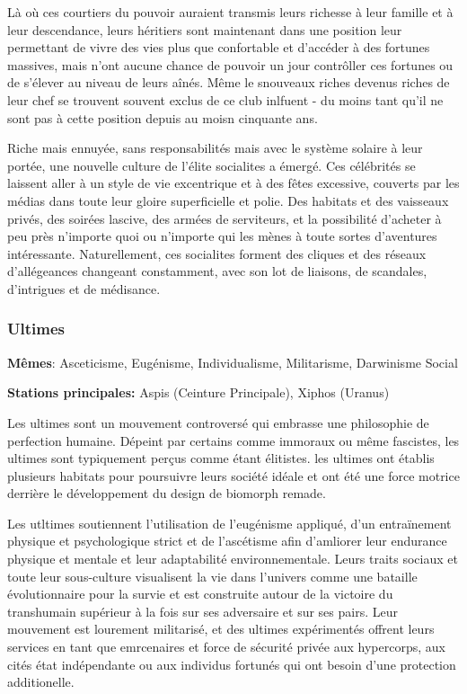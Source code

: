                                              Là où ces courtiers du pouvoir auraient transmis leurs richesse à leur famille et à leur descendance, leurs héritiers sont maintenant dans une position leur permettant de vivre des vies plus que confortable et d'accéder à des fortunes massives, mais n'ont aucune chance de pouvoir un jour contrôller ces fortunes ou de s'élever au niveau de leurs aînés. Même le snouveaux riches devenus riches de leur chef se trouvent souvent exclus de ce club inlfuent - du moins tant qu'il ne sont pas à cette position depuis au moisn cinquante ans. 

                                             Riche mais ennuyée, sans responsabilités mais avec le système solaire à leur portée, une nouvelle culture de l'élite socialites a émergé. Ces célébrités se laissent aller à un style de vie excentrique et à des fêtes excessive, couverts par les médias dans toute leur gloire superficielle et polie. Des habitats et des vaisseaux privés, des soirées lascive, des armées de serviteurs, et la possibilité d'acheter à peu près n'importe quoi ou n'importe qui les mènes à toute sortes d'aventures intéressante. Naturellement, ces socialites forment des cliques et des réseaux d'allégeances changeant constamment, avec son lot de liaisons, de scandales, d'intrigues et de médisance. 

                                             \subsubsection{Ultimes} \label{sec:ultimates} 

                                             \textbf{Mêmes}: Asceticisme, Eugénisme, Individualisme, Militarisme, Darwinisme Social 

                                             \textbf{Stations principales:} Aspis (Ceinture Principale), Xiphos (Uranus) 

                                             Les ultimes sont un mouvement controversé qui embrasse une philosophie de perfection humaine. Dépeint par certains comme immoraux ou même fascistes, les ultimes sont typiquement perçus comme étant élitistes. les ultimes ont établis plusieurs habitats pour poursuivre leurs société idéale et ont été une force motrice derrière le développement du design de biomorph remade. 

                                             Les utltimes soutiennent l'utilisation de l'eugénisme appliqué, d'un entraïnement physique et psychologique strict et de l'ascétisme afin d'amliorer leur endurance physique et mentale et leur adaptabilité environnementale. Leurs traits sociaux et toute leur sous-culture visualisent la vie dans l'univers comme une bataille évolutionnaire pour la survie et est construite autour de la victoire du transhumain supérieur à la fois sur ses adversaire et sur ses pairs. Leur mouvement est lourement militarisé, et des ultimes expérimentés offrent leurs services en tant que emrcenaires et force de sécurité privée aux hypercorps, aux cités état indépendante ou aux individus fortunés qui ont besoin d'une protection additionelle. 

